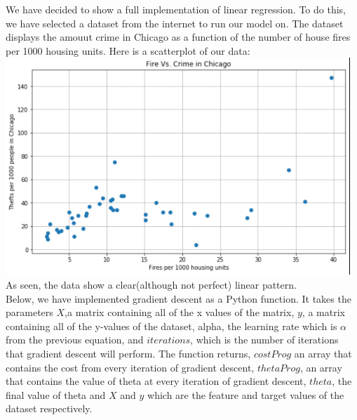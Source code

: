 \documentclass[11pt]{article}
\begin{document}
 

We have decided to show a full implementation of linear regression. To do this, we have selected a dataset from the internet to run our model on. The dataset displays the amouut crime in Chicago as a function of the number of house fires per 1000 housing units. Here is a scatterplot of our data: \newline\smallskip
\includegraphics[scale = .85]{CrimeVsHouseFiresPNG.png}\\
As seen, the data show a clear(although not perfect) linear pattern.\\
Below, we have implemented gradient descent as a Python function. It takes the parameters $X$,a matrix containing all of the x values of the matrix, $y$, a matrix containing all of the y-values of the dataset, alpha, the learning rate which is $\alpha$ from the previous equation, and $iterations$, which is the number of iterations that gradient descent will perform. The function returns, $costProg$ an array that contains the cost from every iteration of gradient descent, $thetaProg$, an array that contains the value of theta at every iteration of gradient descent, $theta$, the final value of theta and $X$ and $y$ which are the feature and target values of the dataset respectively.\\
\end{document}
